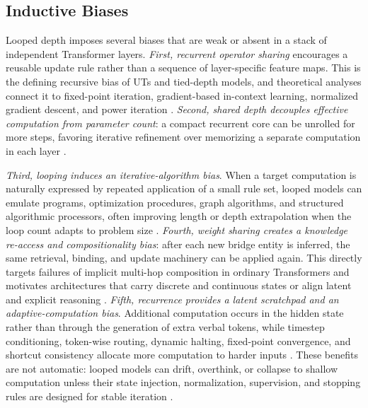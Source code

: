 \subsection{Inductive Biases}

Looped depth imposes several biases that are weak or absent in a stack of independent Transformer layers. \emph{First, recurrent operator sharing} encourages a reusable update rule rather than a sequence of layer-specific feature maps. This is the defining recursive bias of UTs and tied-depth models, and theoretical analyses connect it to fixed-point iteration, gradient-based in-context learning, normalized gradient descent, and power iteration \citep{dehghani2018universal,takase2023lessons,yang2023looped,gatmiry2024can,chen2025bypassing,wu2026powermethod}. \emph{Second, shared depth decouples effective computation from parameter count}: a compact recurrent core can be unrolled for more steps, favoring iterative refinement over memorizing a separate computation in each layer \citep{lan2019albert,saunshi2025latentthoughts,geiping2025scalinglatent,zhu2025scalinglatent,schwethelm2026much}.

\emph{Third, looping induces an iterative-algorithm bias}. When a target computation is naturally expressed by repeated application of a small rule set, looped models can emulate programs, optimization procedures, graph algorithms, and structured algorithmic processors, often improving length or depth extrapolation when the loop count adapts to problem size \citep{giannou2023looped,backdeluca2024simulation,gao2025algoformer,fan2024looped,xu2025cotloop}. \emph{Fourth, weight sharing creates a knowledge re-access and compositionality bias}: after each new bridge entity is inferred, the same retrieval, binding, and update machinery can be applied again. This directly targets failures of implicit multi-hop composition in ordinary Transformers and motivates architectures that carry discrete and continuous states or align latent and explicit reasoning \citep{wang2024grokking,biran2024hopping,guo2025twohop,yao2025implicit,kohli2026loopthinkgeneralize,fu2026discoloop,fan2026lotus}. \emph{Fifth, recurrence provides a latent scratchpad and an adaptive-computation bias}. Additional computation occurs in the hidden state rather than through the generation of extra verbal tokens, while timestep conditioning, token-wise routing, dynamic halting, fixed-point convergence, and shortcut consistency allocate more computation to harder inputs \citep{saunshi2025latentthoughts,geiping2025scalinglatent,bay2025mixture,fu2025thinkathard,jeddi2026loopformer,movahedi2026fixedpoint}. These benefits are not automatic: looped models can drift, overthink, or collapse to shallow computation unless their state injection, normalization, supervision, and stopping rules are designed for stable iteration \citep{chowdhury2024investigating,labovich2026stability,rauba2026tarm,moosa2026dynamiccompute}.

